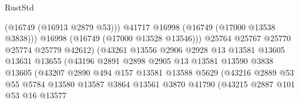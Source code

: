 \begin{lexlean}{RustStd}
\begin{coremodule}
                                            (@16749 (@16913 @2879 @53)))
                                          @41717
                                          @16998
                                          (@16749 (@17000 @13538 @3838)))
                                        @16998
                                        (@16749 (@17000 @13528 @13546)))
                                      @25764
                                      @25767
                                      @25770
                                      @25774
                                      @25779
                                      @42612)
                                    (@43261
                                      @13556
                                      @2906
                                      @2928
                                      @13
                                      @13581
                                      @13605
                                      @13631
                                      @13655
                                      (@43196
                                        @2891
                                        @2898
                                        @2905
                                        @13
                                        @13581
                                        @13590
                                        @3838
                                        @13605
                                        (@43207
                                          @2890
                                          @494
                                          @157
                                          @13581
                                          @13588
                                          @5629
                                          (@43216
                                            @2889
                                            @53
                                            @55
                                            @5784
                                            @13580
                                            @13587
                                            @3864
                                            @13561
                                            @3870
                                            @41790
                                            (@43215
                                              @2887
                                              @101
                                              @53
                                              @16
                                              @13577

\end{coremodule}
\end{lexlean}
